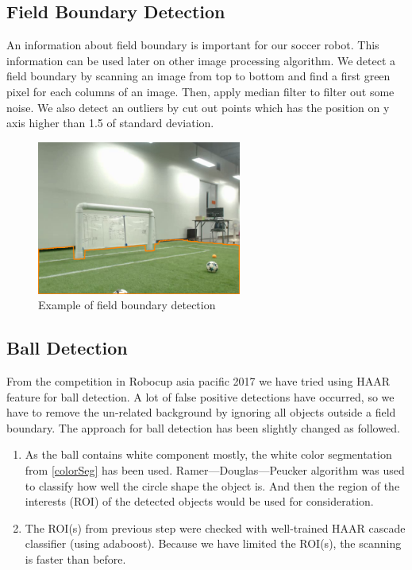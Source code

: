 	\subsection{Field Boundary Detection}
	An information about field boundary is important for our soccer robot. This information can be used later on other image processing algorithm. We detect a field boundary by scanning an image from top to bottom and find a first green pixel for each columns of an image. Then, apply median filter to filter out some noise. We also detect an outliers by cut out points which has the position on y axis higher than 1.5 of standard deviation. 
	\begin{figure}[H]
		\centering
		\includegraphics[width=0.6\textwidth]{image/fieldLine1.png}
		\caption{Example of field boundary detection}
		\label{fieldBoundary}
	\end{figure}
	
	\subsection{Ball Detection}
	From the competition in Robocup asia pacific 2017 we have tried using HAAR feature for ball detection. A lot of false positive detections have occurred, so we have to remove the un-related background by ignoring all objects outside a field boundary. The approach for ball detection has been slightly changed as followed.
	\begin{enumerate}
		\item As the ball contains white component mostly, the white color segmentation from \ref{colorSeg} has been used. Ramer---Douglas---Peucker algorithm was used to classify how well the circle shape the object is. And then the region of the interests (ROI) of the detected objects would be used for consideration.
		
		\item The ROI(s) from previous step were checked with well-trained HAAR cascade classifier (using adaboost).  Because we have limited the ROI(s), the scanning is faster than before. 
	\end{enumerate}
	
